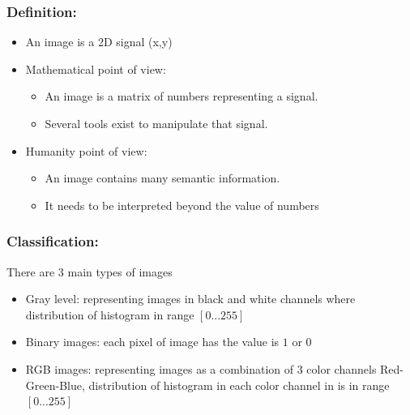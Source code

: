 \subsubsection{Definition:}
\begin{itemize}
\item An image is a 2D signal (x,y)
\item Mathematical point of view:
\begin{itemize}
\item An image is a matrix of numbers representing a signal.
\item Several tools exist to manipulate that signal.
\end{itemize}
\item Humanity point of view:
\begin{itemize}
\item An image contains many semantic information.
\item It needs to be interpreted beyond the value of numbers
\end{itemize}
\end{itemize}
\subsubsection{Classification:} There are 3 main types of images
\begin{itemize}
\item Gray level: representing images in black and white channels where distribution of  histogram in range $[0 ... 255]$
\item Binary images: each pixel of image has the value is $1$ or $0$
\item RGB images: representing images as a combination of 3 color channels Red-Green-Blue, distribution of histogram in each color channel in is in range $[0...255]$
\end{itemize}
